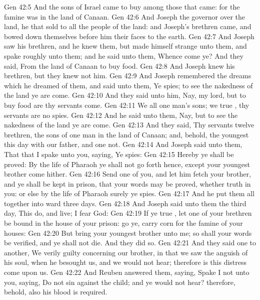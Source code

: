 \vs Gen 42:5 And the sons of Israel came to buy  among those that came: for the famine was in the land of Canaan.
\vs Gen 42:6 And Joseph  the governor over the land,  he  that sold to all the people of the land: and Joseph's brethren came, and bowed down themselves before him  their faces to the earth.
\vs Gen 42:7 And Joseph saw his brethren, and he knew them, but made himself strange unto them, and spake roughly unto them; and he said unto them, Whence come ye? And they said, From the land of Canaan to buy food.
\vs Gen 42:8 And Joseph knew his brethren, but they knew not him.
\vs Gen 42:9 And Joseph remembered the dreams which he dreamed of them, and said unto them, Ye  spies; to see the nakedness of the land ye are come.
\vs Gen 42:10 And they said unto him, Nay, my lord, but to buy food are thy servants come.
\vs Gen 42:11 We  all one man's sons; we  true , thy servants are no spies.
\vs Gen 42:12 And he said unto them, Nay, but to see the nakedness of the land ye are come.
\vs Gen 42:13 And they said, Thy servants  twelve brethren, the sons of one man in the land of Canaan; and, behold, the youngest  this day with our father, and one  not.
\vs Gen 42:14 And Joseph said unto them, That  that I spake unto you, saying, Ye  spies:
\vs Gen 42:15 Hereby ye shall be proved: By the life of Pharaoh ye shall not go forth hence, except your youngest brother come hither.
\vs Gen 42:16 Send one of you, and let him fetch your brother, and ye shall be kept in prison, that your words may be proved, whether  truth in you: or else by the life of Pharaoh surely ye  spies.
\vs Gen 42:17 And he put them all together into ward three days.
\vs Gen 42:18 And Joseph said unto them the third day, This do, and live;  I fear God:
\vs Gen 42:19 If ye  true , let one of your brethren be bound in the house of your prison: go ye, carry corn for the famine of your houses:
\vs Gen 42:20 But bring your youngest brother unto me; so shall your words be verified, and ye shall not die. And they did so.
\vs Gen 42:21 And they said one to another, We  verily guilty concerning our brother, in that we saw the anguish of his soul, when he besought us, and we would not hear; therefore is this distress come upon us.
\vs Gen 42:22 And Reuben answered them, saying, Spake I not unto you, saying, Do not sin against the child; and ye would not hear? therefore, behold, also his blood is required.
